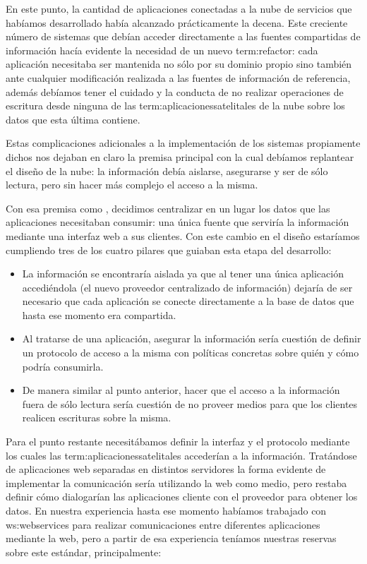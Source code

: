 En este punto, la cantidad de aplicaciones conectadas a la nube de servicios que habíamos desarrollado había alcanzado prácticamente la decena. Este creciente número de sistemas que debían acceder directamente a las fuentes compartidas de información hacía evidente la necesidad de un nuevo \gls{term:refactor}: cada aplicación necesitaba ser mantenida no sólo por su dominio propio sino también ante cualquier modificación realizada a las fuentes de información de referencia, además debíamos tener el cuidado y la conducta de no realizar operaciones de escritura desde ninguna de las \gls{term:aplicacionessatelitales} de la nube sobre los datos que esta última contiene.

Estas complicaciones adicionales a la implementación de los sistemas propiamente dichos nos dejaban en claro la premisa principal con la cual debíamos replantear el diseño de la nube: la información debía aislarse, asegurarse y ser de sólo lectura, pero sin hacer más complejo el acceso a la misma.

Con esa premisa como , decidimos centralizar en un lugar los datos que las aplicaciones necesitaban consumir: una única fuente que serviría la información mediante una interfaz web a sus clientes. Con este cambio en el diseño estaríamos cumpliendo tres de los cuatro pilares que guiaban esta etapa del desarrollo:

\begin{itemize}
  \item La información se encontraría aislada ya que al tener una única aplicación accediéndola (el nuevo proveedor centralizado de información) dejaría de ser necesario que cada aplicación se conecte directamente a la base de datos que hasta ese momento era compartida.

  \item Al tratarse de una aplicación, asegurar la información sería cuestión de definir un protocolo de acceso a la misma con políticas concretas sobre quién y cómo podría consumirla.

  \item De manera similar al punto anterior, hacer que el acceso a la información fuera de sólo lectura sería cuestión de no proveer medios para que los clientes realicen escrituras sobre la misma.
\end{itemize}

Para el punto restante necesitábamos definir la interfaz y el protocolo mediante los cuales las \gls{term:aplicacionessatelitales} accederían a la información. Tratándose de aplicaciones web separadas en distintos servidores la forma evidente de implementar la comunicación sería utilizando la web como medio, pero restaba definir cómo dialogarían las aplicaciones cliente con el proveedor para obtener los datos. En nuestra experiencia hasta ese momento habíamos trabajado con \glspl{ws:webservice} para realizar comunicaciones entre diferentes aplicaciones mediante la web, pero a partir de esa experiencia teníamos nuestras reservas sobre este estándar, principalmente:

